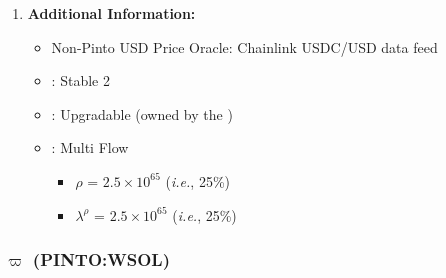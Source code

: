 \documentclass[class=article, crop=false]{standalone}
\begin{document}
\begin{enumerate}
    \item \textbf{Additional Information:}
        \begin{itemize}
            \item Non-Pinto USD Price Oracle: Chainlink USDC/USD data feed
            \item {}: Stable 2
            \item {}: Upgradable  (owned by the )
            \item {}: Multi Flow
                \begin{itemize}
                    \item $\rho$ = $2.5 \times 10^{65}$ (\textit{i.e.}, 25\%)
                    \item $\lambda^{\rho}$ = $2.5 \times 10^{65}$ (\textit{i.e.}, 25\%)
                \end{itemize}
        \end{itemize}

\end{enumerate}


\subsubsection{$\varpi$ (PINTO:WSOL)}
\end{document}
